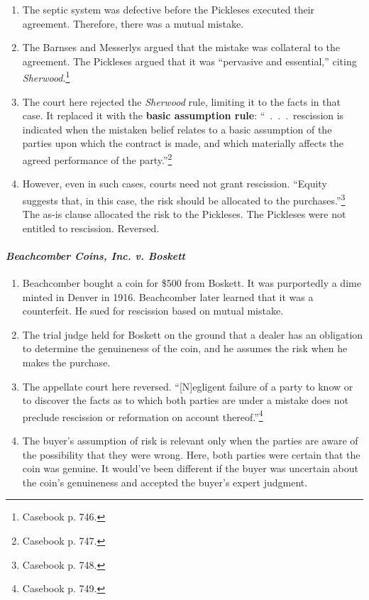 \begin{enumerate}
    time the contract is executed.''\footnote{Casebook p. 745.}
    \item The septic system was defective before the Pickleses executed their 
    agreement. Therefore, there was a mutual mistake.
    \item The Barnses and Messerlys argued that the mistake was collateral to 
    the agreement. The Pickleses argued that it was ``pervasive and 
    essential,'' citing \emph{Sherwood}.\footnote{Casebook p. 746.}
    \item The court here rejected the \emph{Sherwood} rule, limiting it to the 
    facts in that case. It replaced it with the \textbf{basic assumption 
    rule}: ``~.~.~.~rescission is indicated when the mistaken belief relates 
    to a basic assumption of the parties upon which the contract is made, and 
    which materially affects the agreed performance of the 
    party.''\footnote{Casebook p. 747.}
    \item However, even in such cases, courts need not grant rescission. 
    ``Equity suggests that, in this case, the risk should be allocated to the 
    purchases.''\footnote{Casebook p. 748.} The as-is clause allocated the 
    risk to the Pickleses. The Pickleses were not entitled to rescission. 
    Reversed.
\end{enumerate}

\paragraph{\emph{Beachcomber Coins, Inc. v. Boskett}}

\begin{enumerate}
    \item Beachcomber bought a coin for \$500 from Boskett. It was purportedly 
    a dime minted in Denver in 1916. Beachcomber later learned that it was a 
    counterfeit. He sued for rescission based on mutual mistake.
    \item The trial judge held for Boskett on the ground that a dealer has an 
    obligation to determine the genuineness of the coin, and he assumes the 
    risk when he makes the purchase.
    \item The appellate court here reversed. ``[N]egligent failure of a party 
    to know or to discover the facts as to which both parties are under a 
    mistake does not preclude rescission or reformation on account 
    thereof.''\footnote{Casebook p. 749.}
    \item The buyer's assumption of risk is relevant only when the parties are 
    aware of the possibility that they were wrong. Here, both parties were 
    certain that the coin was genuine. It would've been different if the buyer 
    was uncertain about the coin's genuineness and accepted the buyer's expert 
    judgment.
\end{enumerate}

